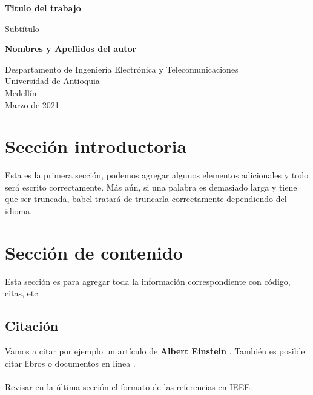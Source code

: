 \documentclass{article}
\begin{document}
\begin{titlepage}
    \begin{center}
        \vspace*{1cm}
            
        \Huge
        \textbf{Titulo del trabajo}
            
        \vspace{0.5cm}
        \LARGE
        Subtítulo
            
        \vspace{1.5cm}
            
        \textbf{Nombres y Apellidos del autor}
            
        \vfill
            
        \vspace{0.8cm}
            
        \Large
        Despartamento de Ingeniería Electrónica y Telecomunicaciones\\
        Universidad de Antioquia\\
        Medellín\\
        Marzo de 2021
            
    \end{center}
\end{titlepage}

\tableofcontents
\newpage
\section{Sección introductoria}\label{intro}
Esta es la primera sección, podemos agregar algunos elementos adicionales y todo será escrito correctamente. Más aún, si una palabra es demasiado larga y tiene que ser truncada, babel tratará de truncarla correctamente dependiendo del idioma.

\section{Sección de contenido} \label{contenido}
Esta sección es para agregar toda la información correspondiente con código, citas, etc.
\subsection{Citación}
Vamos a citar por ejemplo un artículo de \textbf{Albert Einstein} \cite{einstein}.
También es posible citar libros \cite{dirac} o documentos en línea \cite{knuthwebsite}.\\\\
Revisar en la última sección el formato de las referencias en IEEE.
\end{document}

